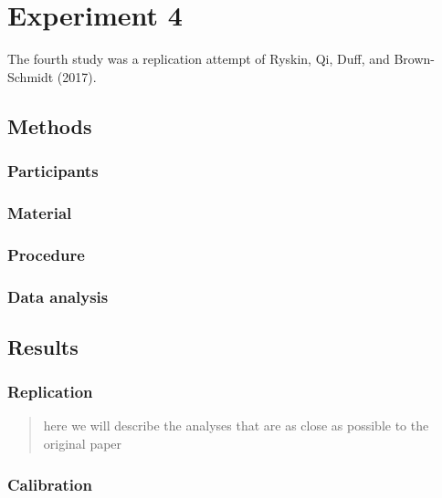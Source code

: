 \documentclass[
  english,
  man]{apa6}
\begin{document}
\hypertarget{experiment-4}{%
\section{Experiment 4}\label{experiment-4}}

The fourth study was a replication attempt of Ryskin, Qi, Duff, and Brown-Schmidt (2017).

\hypertarget{methods-3}{%
\subsection{Methods}\label{methods-3}}

\hypertarget{participants-3}{%
\subsubsection{Participants}\label{participants-3}}

\hypertarget{material-2}{%
\subsubsection{Material}\label{material-2}}

\hypertarget{procedure-3}{%
\subsubsection{Procedure}\label{procedure-3}}

\hypertarget{data-analysis-2}{%
\subsubsection{Data analysis}\label{data-analysis-2}}

\hypertarget{results-3}{%
\subsection{Results}\label{results-3}}

\hypertarget{replication-2}{%
\subsubsection{Replication}\label{replication-2}}

\begin{quote}
here we will describe the analyses that are as close as possible to the original paper
\end{quote}

\hypertarget{calibration-2}{%
\subsubsection{Calibration}\label{calibration-2}}
\end{document}
